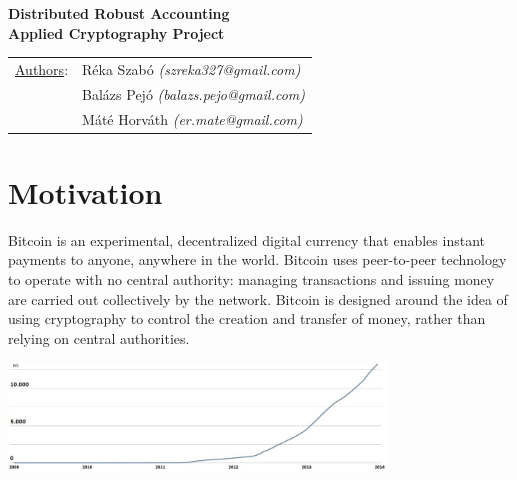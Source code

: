 \documentclass[a4paper,12pt]{article}
\begin{document}
\pagestyle{fancy}
\rhead{}
\begin{center}
\LARGE{\textbf{Distributed Robust Accounting}}\\
\vspace{0.5cm}
\textbf{\large{Applied Cryptography Project}}\\
\vspace{0.5cm}
\end{center}
\begin{tabular}{p{2cm}l}
\underline{Authors}:&Réka Szabó \textit{(szreka327@gmail.com)}\\
&Balázs Pejó \textit{(balazs.pejo@gmail.com)}\\
&Máté Horváth \textit{(er.mate@gmail.com)}
\end{tabular}
\section{Motivation}
Bitcoin is an experimental, decentralized digital currency that enables instant payments to anyone, anywhere in the world. Bitcoin uses peer-to-peer technology to operate with no central authority: managing transactions and issuing money are carried out collectively by the network. Bitcoin is designed around the idea of using cryptography to control the creation and transfer of money, rather than relying on central authorities.

\begin{center}
\includegraphics[width=10cm]{blockchainsize.jpg}
\end{center}
\end{document}
